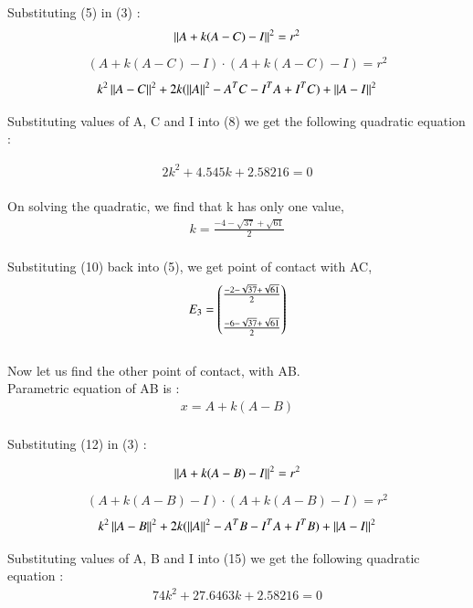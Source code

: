 \documentclass[journal,12pt,twocolumn]{IEEEtran}
\theoremstyle{remark}
\begin{document}
\begin{flushleft}
	Substituting (5) in (3) : 
	\begin{align}
		{\left\lVert A+k(A-C)-I \right\rVert}^2 = {r}^2 
	\end{align}
	\begin{align}
		(A+k(A-C)-I)\cdot(A+k(A-C)-I) = {r}^2
	\end{align}
	\begin{align}
		k^2 \left\lVert A-C\right\rVert^2 + 2k(\left\lVert A\right\rVert^2 - {A}^T C - {I}^T A + {I}^T C) + \left\lVert A-I\right\rVert^2
	\end{align}

	Substituting values of A, C and I into (8) we get the following quadratic equation :

	\begin{align}
		2k^2 + 4.545k + 2.58216 = 0
	\end{align}\\

	On solving the quadratic, we find that k has only one value,
	\begin{align}
		k = \frac{-4-\sqrt{37}+\sqrt{61}}{2}
	\end{align}\\

	Substituting (10) back into (5), we get point of contact with AC,
	\begin{align}
		{E}_3 = \begin{pmatrix}
			\frac{-2-\sqrt{37}+\sqrt{61}}{2}\\ \\
			\frac{-6-\sqrt{37}+\sqrt{61}}{2}
		\end{pmatrix}
	\end{align}\\

	\bigskip
	Now let us find the other point of contact, with AB.\\
	\bigskip
	Parametric equation of AB is : 
	\begin{align}
		x = A + k(A-B)
	\end{align}\\

	Substituting (12) in (3) : 

	\begin{align}
		{\left\lVert A+k(A-B)-I \right\rVert}^2 = {r}^2 
	\end{align}
	\begin{align}
		(A+k(A-B)-I)\cdot(A+k(A-B)-I) = {r}^2
	\end{align}
	\begin{align}
		k^2 \left\lVert A-B\right\rVert^2 + 2k(\left\lVert A\right\rVert^2 - {A}^T B - {I}^T A + {I}^T B) + \left\lVert A-I\right\rVert^2
	\end{align}

	Substituting values of A, B and I into (15) we get the following quadratic equation :
	\begin{align}
		74k^2 + 27.6463k + 2.58216 = 0
	\end{align}\\


\end{flushleft}
\end{document}

